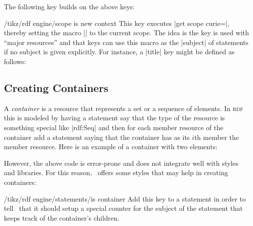 The following key builds on the above keys:
\begin{key}{/tikz/rdf engine/scope is new context}
  This key executes |get scope curie=\tikzrdfcontext|, thereby
  setting the macro |\tikzrdfcontext| to the current scope. The idea
  is the key is used with ``major resources'' and that keys can
  use this macro as the |subject| of statements if no subject is given
  explicitly. For instance, a |title| key might be defined as follows: 
\end{key}


\subsection{Creating Containers}

A \emph{container} is a resource that represents a set or a sequence
of elements. In \textsc{rdf} this is modeled by having a statement say
that the type of the resource is something special like |rdf:Seq| and
then for each member resource of the container add a statement saying
that the container has as its $i$th member the  member resource. Here
is an example of a container with two elements:

\begin{codeexample}
\end{codeexample}

However, the above code is error-prone and does not integrate well
with styles and libraries. For this reason, \tikzname\ offers some
styles that may help in creating containers:

\begin{key}{/tikz/rdf engine/statements/is container}
  Add this key to a statement in order to tell \tikzname\ that it
  should setup a special counter for the subject of the statement that
  keeps track of the container's children.   
\end{key}

